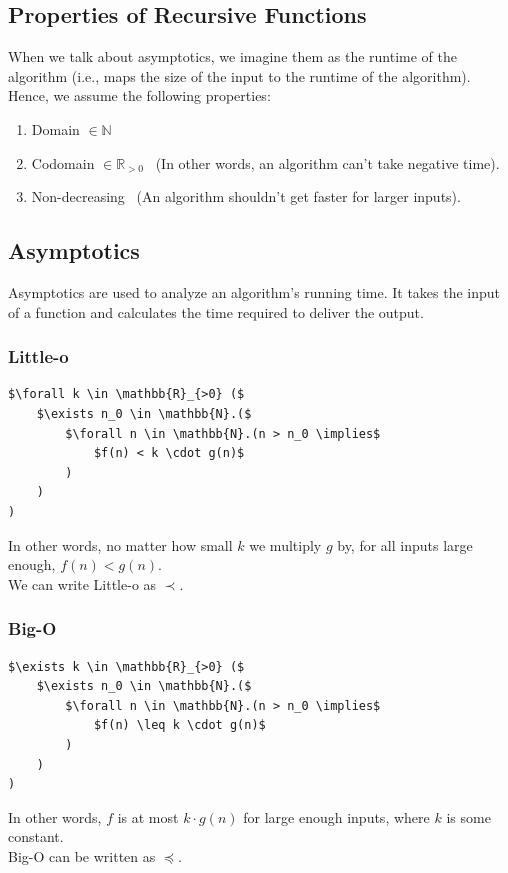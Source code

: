 \documentclass{article}
\begin{document}
\subsection{Properties of Recursive Functions}
When we talk about asymptotics, we imagine them as the runtime of the algorithm (i.e., maps the size of the input to the runtime of the algorithm).\\
Hence, we assume the following properties:
\begin{enumerate}
    \item Domain $\in \mathbb{N}$
    \item Codomain $\in \mathbb{R}_{>0}$ \ (In other words, an algorithm can't take negative time).
    \item Non-decreasing \ (An algorithm shouldn't get faster for larger inputs).
\end{enumerate}

\subsection{Asymptotics}
Asymptotics are used to analyze an algorithm's running time. It takes the input of a function and calculates the time required to deliver the output.

\subsubsection{Little-o}
\begin{lstlisting}
$\forall k \in \mathbb{R}_{>0} ($
    $\exists n_0 \in \mathbb{N}.($
        $\forall n \in \mathbb{N}.(n > n_0 \implies$
            $f(n) < k \cdot g(n)$
        )
    )
)
\end{lstlisting}
In other words, no matter how small $k$ we multiply $g$ by, for all inputs large enough, $f(n) < g(n)$.\\
We can write Little-o as $\prec$.\\
\subsubsection{Big-O}
\begin{lstlisting}
$\exists k \in \mathbb{R}_{>0} ($
    $\exists n_0 \in \mathbb{N}.($
        $\forall n \in \mathbb{N}.(n > n_0 \implies$
            $f(n) \leq k \cdot g(n)$
        )
    )
)
\end{lstlisting}
In other words, $f$ is at most $k \cdot g(n)$ for large enough inputs, where $k$ is some constant.\\
Big-O can be written as $\preceq$.
\end{document}
